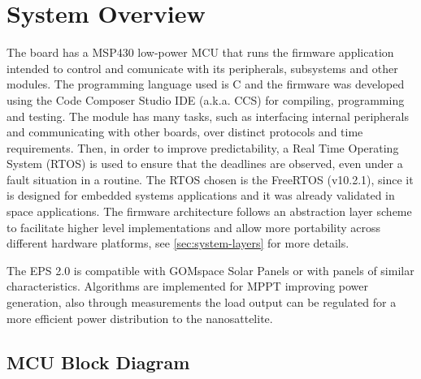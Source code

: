 %
%
%
%
%

%
%
%
%
%
%

\chapter{System Overview} \label{ch:system-overview}

The board has a MSP430 low-power MCU that runs the firmware application intended to control and comunicate with its peripherals, subsystems and other modules. The programming language used is C and the firmware was developed using the Code Composer Studio IDE (a.k.a. CCS) for compiling, programming and testing. The module has many tasks, such as interfacing internal peripherals and communicating with other boards, over distinct protocols and time requirements. 
Then, in order to improve predictability, a Real Time Operating System (RTOS) is used to ensure that the deadlines are observed, even under a fault situation in a routine. The RTOS chosen is the FreeRTOS (v10.2.1), since it is designed for embedded systems applications and it was already validated in space applications. The firmware architecture follows an abstraction layer scheme to facilitate higher level implementations and allow more portability across different hardware platforms, see \autoref{sec:system-layers} for more details.

The EPS 2.0 is compatible with GOMspace Solar Panels or with panels of similar characteristics. Algorithms are implemented for MPPT improving power generation, also through measurements the load output can be regulated for a more efficient power distribution to the nanosattelite.

\section{MCU Block Diagram}

